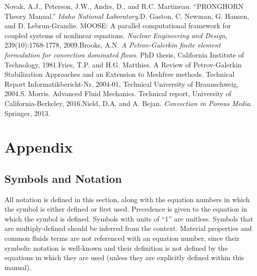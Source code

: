 \documentclass[10pt]{article}
\numberwithin{equation}{section} %
\begin{document}
\begin{flushleft}
[1]\quad Novak, A.J., Peterson, J.W., Andrs, D., and R.C. Martineau. ``PRONGHORN Theory Manual.'' \textit{Idaho National Laboratory}.\newline\newline
[2]\quad D. Gaston, C. Newman, G. Hansen, and D. Lebrun-Grandie. MOOSE: A parallel computational framework for coupled systems of nonlinear equations. \textit{Nuclear Engineering and Design}, 239(10):1768-1778, 2009.\newline\newline
[3]\quad Brooks, A.N. \textit{A Petrov-Galerkin finite element formulation for convection dominated flows}. PhD thesis, California Institute of Technology, 1981.\newline\newline
[4]\quad Fries, T.P. and H.G. Matthies. A Review of Petrov-Galerkin Stabilization Approaches and an Extension to Meshfree methods. Technical Report Informatikbericht-Nr. 2004-01, Technical University of Braunschweig, 2004.\newline\newline
[5]\quad S. Morris. Advanced Fluid Mechanics. Technical report, University of California-Berkeley, 2016.\newline\newline
[6]\quad Nield, D.A. and A. Bejan. \textit{Convection in Porous Media}. Springer, 2013.

\end{flushleft}



























\clearpage
\section{Appendix}

\subsection{Symbols and Notation}
All notation is defined in this section, along with the equation numbers in which the symbol is either defined or first used. Precedence is given to the equation in which the symbol is defined. Symbols with units of ``1'' are unitless. Symbols that are multiply-defined should be inferred from the context. Material properties and common fluids terms are not referenced with an equation number, since their symbolic notation is well-known and their definition is not defined by the equations in which they are used (unless they are explicitly defined within this manual).\newline
\end{document}
